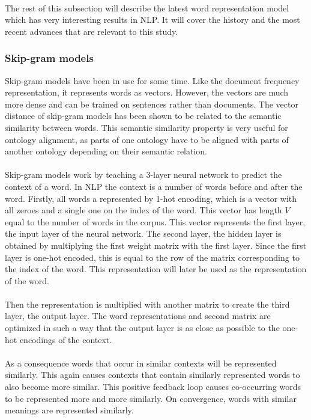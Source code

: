 \documentclass{article}
\begin{document}
 \paragraph{}
 The rest of this subsection will describe the latest word representation model which has very interesting results in NLP. It will cover the history and the most recent advances that are relevant to this study.
 
 \subsubsection{Skip-gram models}
 Skip-gram models have been in use for some time. Like the document frequency representation, it represents words as vectors. However, the vectors are much more dense and can be trained on sentences rather than documents. The vector distance of skip-gram models has been shown to be related to the semantic similarity between words. This semantic similarity property is very useful for ontology alignment, as parts of one ontology have to be aligned with parts of another ontology depending on their semantic relation.
 \paragraph{}
 Skip-gram models work by teaching a 3-layer neural network to predict the context of a word. In NLP the context is a number of words before and after the word. Firstly, all words a represented by 1-hot encoding, which is a vector with all zeroes and a single one on the index of the word. This vector has length $V$ equal to the number of words in the corpus. This vector represents the first layer, the input layer of the neural network. The second layer, the hidden layer is obtained by multiplying the first weight matrix with the first layer. Since the first layer is one-hot encoded, this is equal to the row of the matrix corresponding to the index of the word. This representation will later be used as the representation of the word.
 \paragraph{}
 Then the representation is multiplied with another matrix to create the third layer, the output layer. The word representations and second matrix are optimized in such a way that the output layer is as close as possible to the one-hot encodings of the context.
 \paragraph{}
 As a consequence words that occur in similar contexts will be represented similarly. This again causes contexts that contain similarly represented words to also become more similar. This positive feedback loop causes co-occurring words to be represented more and more similarly. On convergence, words with similar meanings are represented similarly.
 
\end{document}
